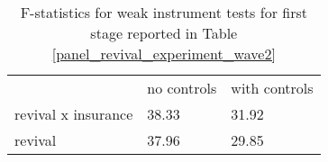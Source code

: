 \begin{table}[ht]
\centering
\caption{F-statistics for weak instrument tests for first stage reported in Table \ref{panel_revival_experiment_wave2}} 
\label{revival_iv_ftest}
\begin{tabular}{lll}
  \hline
  \hline
 & \multicolumn{1}{l}{no controls} & \multicolumn{1}{l}{with controls} \\ 
  revival x insurance & 38.33 & 31.92 \\ 
  revival & 37.96 & 29.85 \\ 
   \hline
\end{tabular}
\end{table}

